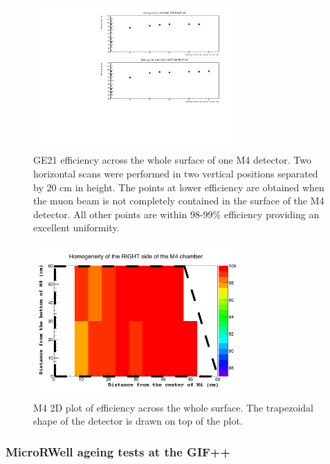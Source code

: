 %
\begin{figure}[h!]
\centering
\includegraphics[width=0.7\textwidth]{Figures/Muon/microrwell-GE21-uniformity.pdf}
\caption{GE21 efficiency across the whole surface of one M4 detector. Two horizontal scans were performed in two vertical positions separated by 20 cm in height. The points at lower efficiency are obtained when the muon beam is not completely contained in the surface of the M4 detector. All other points are within 98-99\% efficiency providing an excellent uniformity.}
\label{fig:urwell-GE21-uniformity}
\end{figure}

%
\begin{figure}[h!]
\centering
\includegraphics[width=0.7\textwidth]{Figures/Muon/microrwell-GE21-uniformity-2D.pdf}
\caption{M4 2D plot of efficiency across the whole surface. The trapezoidal shape of the detector is drawn on top of the plot.}
\label{fig:urwell-GE21-uniformity-2D}
\end{figure}



\subsubsection{MicroRWell ageing tests at the GIF++}
\label{section:uRWell-ageing}

